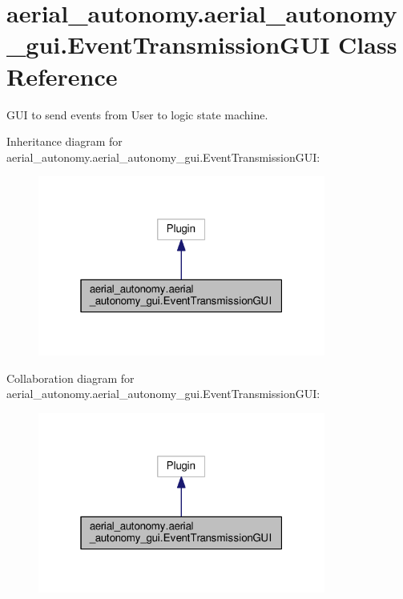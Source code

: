 \hypertarget{classaerial__autonomy_1_1aerial__autonomy__gui_1_1EventTransmissionGUI}{\section{aerial\-\_\-autonomy.\-aerial\-\_\-autonomy\-\_\-gui.\-Event\-Transmission\-G\-U\-I Class Reference}
\label{classaerial__autonomy_1_1aerial__autonomy__gui_1_1EventTransmissionGUI}
}


G\-U\-I to send events from User to logic state machine.  




Inheritance diagram for aerial\-\_\-autonomy.\-aerial\-\_\-autonomy\-\_\-gui.\-Event\-Transmission\-G\-U\-I\-:\nopagebreak
\begin{figure}[H]
\begin{center}
\leavevmode
\includegraphics[width=268pt]{classaerial__autonomy_1_1aerial__autonomy__gui_1_1EventTransmissionGUI__inherit__graph}
\end{center}
\end{figure}


Collaboration diagram for aerial\-\_\-autonomy.\-aerial\-\_\-autonomy\-\_\-gui.\-Event\-Transmission\-G\-U\-I\-:\nopagebreak
\begin{figure}[H]
\begin{center}
\leavevmode
\includegraphics[width=268pt]{classaerial__autonomy_1_1aerial__autonomy__gui_1_1EventTransmissionGUI__coll__graph}
\end{center}
\end{figure}
